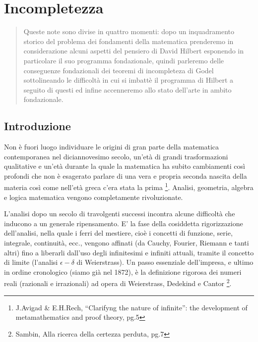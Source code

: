 
\newcommand{\noun}[1]{\textsc{#1}}
\providecommand*{\perispomeni}{\char126}

\chapter{Incompletezza}

\begin{abstract}
Queste note sono divise in quattro momenti: dopo un inquadramento
storico del problema dei fondamenti della matematica prenderemo in
considerazione alcuni aspetti del pensiero di David Hilbert esponendo
in particolare il suo programma fondazionale, quindi parleremo delle
conseguenze fondazionali dei teoremi di incompleteza di Godel sottolineando
le difficoltà in cui si imbattè il programma di Hilbert a seguito
di questi ed infine accenneremo allo stato dell'arte in ambito fondazionale.
\end{abstract}

\section{Introduzione}

Non è fuori luogo individuare le origini di gran parte della matematica
contemporanea nel diciannovesimo secolo, un'età di grandi trasformazioni
qualitative e un'età durante la quale la matematica ha subito cambiamenti
così profondi che non è esagerato parlare di una vera e propria seconda
nascita della materia così come nell'età greca c'era stata la prima%
\footnote{J.Avigad \& E.H.Rech, {}``Clarifyng the nature of infinite'': the
development of metamathematics and proof theory, pg.5%
}. Analisi, geometria, algebra e logica matematica vengono completamente
rivoluzionate.

L'analisi dopo un secolo di travolgenti successi incontra alcune difficoltà
che inducono a un generale ripensamento. E' la fase della cosiddetta
rigorizzazione dell\textquoteright{}analisi, nella quale i ferri del
mestiere, cioè i concetti di funzione, serie, integrale, continuità,
ecc., vengono affinati (da Cauchy, Fourier, Riemann e tanti altri)
fino a liberarli dall\textquoteright{}uso degli infinitesimi e infiniti
attuali, tramite il concetto di limite (l\textquoteright{}analisi
$\epsilon - \delta$ di Weierstrass). Un passo
essenziale dell\textquoteright{}impresa, e ultimo in ordine cronologico
(siamo già nel 1872), è la definizione rigorosa dei numeri reali (razionali
e irrazionali) ad opera di Weierstrass, Dedekind e Cantor%
\footnote{Sambin, Alla ricerca della certezza perduta, pg.7%
}.

